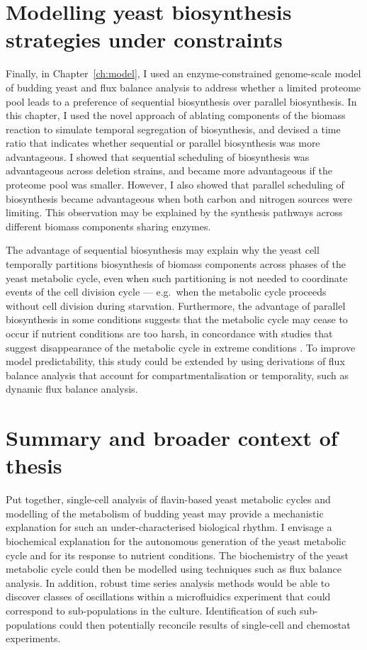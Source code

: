 \section{Modelling yeast biosynthesis strategies under constraints}
\label{sec:concl-model}

Finally, in Chapter~\ref{ch:model}, I used an enzyme-constrained genome-scale model of budding yeast and flux balance analysis to address whether a limited proteome pool leads to a preference of sequential biosynthesis over parallel biosynthesis.
In this chapter, I used the novel approach of ablating components of the biomass reaction to simulate temporal segregation of biosynthesis, and devised a time ratio that indicates whether sequential or parallel biosynthesis was more advantageous.
I showed that sequential scheduling of biosynthesis was advantageous across deletion strains, and became more advantageous if the proteome pool was smaller.
However, I also showed that parallel scheduling of biosynthesis became advantageous when both carbon and nitrogen sources were limiting.
This observation may be explained by the synthesis pathways across different biomass components sharing enzymes.

The advantage of sequential biosynthesis may explain why the yeast cell temporally partitions biosynthesis of biomass components across phases of the yeast metabolic cycle, even when such partitioning is not needed to coordinate events of the cell division cycle --- e.g.\ when the metabolic cycle proceeds without cell division during starvation.
Furthermore, the advantage of parallel biosynthesis in some conditions suggests that the metabolic cycle may cease to occur if nutrient conditions are too harsh, in concordance with studies that suggest disappearance of the metabolic cycle in extreme conditions \parencite{oneillEukaryoticCellBiology2020}.
To improve model predictability, this study could be extended by using derivations of flux balance analysis that account for compartmentalisation or temporality, such as dynamic flux balance analysis.


\section{Summary and broader context of thesis}
\label{sec:concl-summary}

Put together, single-cell analysis of flavin-based yeast metabolic cycles and modelling of the metabolism of budding yeast may provide a mechanistic explanation for such an under-characterised biological rhythm.
I envisage a biochemical explanation for the autonomous generation of the yeast metabolic cycle and for its response to nutrient conditions.
The biochemistry of the yeast metabolic cycle could then be modelled using techniques such as flux balance analysis.
In addition, robust time series analysis methods would be able to discover classes of oscillations within a microfluidics experiment that could correspond to sub-populations in the culture.
Identification of such sub-populations could then potentially reconcile results of single-cell and chemostat experiments.


